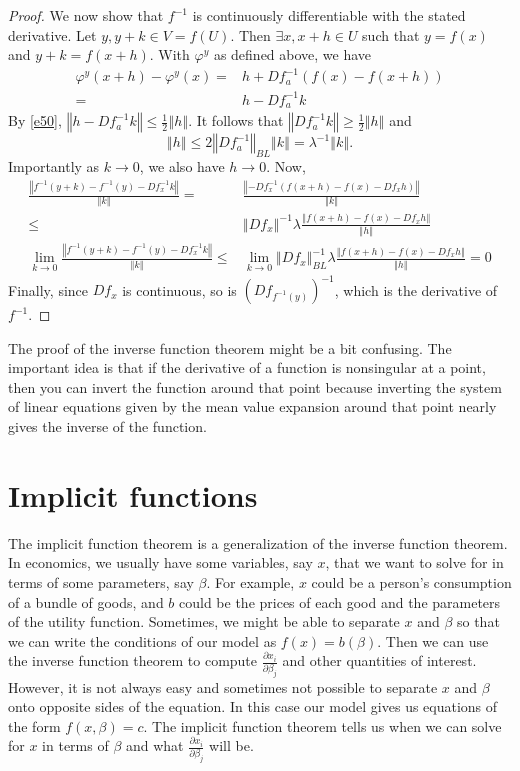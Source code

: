 \documentclass[12pt,reqno]{amsart}
\theoremstyle{definition}
\newcommand{\norm}[1]{\left\Vert {#1} \right\Vert}
\renewcommand{\to}{{\rightarrow}}
\begin{document}
\begin{proof}
  We now show that $f^{-1}$ is continuously differentiable with the
  stated derivative. Let $y, y+k \in V = f(U)$. Then $\exists x, x+h
  \in U$ such that $y = f(x)$ and $y+k = f(x+h)$. With $\varphi^y$ as
  defined above, we have
  \begin{align*}
    \varphi^y(x+h) - \varphi^y(x) = & h + Df_a^{-1}(f(x) - f(x+h))  \\
    = & h - Df_a^{-1} k
  \end{align*}
  By \ref{e50}, $\norm{h - Df_a^{-1} k} \leq \frac{1}{2} \norm{h}$. It
  follows that $\norm{Df_a^{-1} k} \geq \frac{1}{2} \norm{h}$ and 
  \[ \norm{h} \leq 2 \norm{Df_a^{-1}}_{BL} \norm{k} = \lambda^{-1}
  \norm{k}. \]
  Importantly as $k \to 0$, we also have $h \to 0$. Now, 
  \begin{align*}
    \frac{\norm{f^{-1} (y+k) - f^{-1}(y) - Df_x^{-1} k }}{\norm{k}}
    = & \frac{\norm{-Df_x^{-1}(f(x+h) - f(x) - Df_x h)}}{\norm{k}}
    \\
    \leq & \norm{Df_x}^{-1}\lambda \frac{\norm{f(x+h) - f(x) - Df_x
        h}}{\norm{h}} \\
    \lim_{k \to 0} \frac{\norm{f^{-1} (y+k) - f^{-1}(y) - Df_x^{-1} k
      }}{\norm{k}} \leq & \lim_{k \to 0} \norm{Df_x}_{BL}^{-1}\lambda
    \frac{\norm{f(x+h) - f(x) - Df_x h}}{\norm{h}} = 0
  \end{align*}
  Finally, since $Df_x$ is continuous, so is $(Df_{f^{-1}(y)})^{-1}$,
  which is the derivative of $f^{-1}$.  
\end{proof}
The proof of the inverse function theorem might be a bit
confusing. The important idea is that if the derivative of a function
is nonsingular at a point, then you can invert the function around
that point because inverting the system of linear equations given by
the mean value expansion around that point nearly gives the inverse of
the function. 

\section{Implicit functions}

The implicit function theorem is a generalization of the inverse
function theorem. In economics, we usually have some variables, say
$x$, that we want to solve for in terms of some parameters, say
$\beta$. For example, $x$ could be a person's consumption of a bundle of
goods, and $b$ could be the prices of each good and the parameters of
the utility function. Sometimes, we might be able to separate $x$ and
$\beta$ so that we can write the conditions of our model as $f(x) =
b(\beta)$. Then we can use the inverse function theorem to compute
$\frac{\partial x_i}{  \partial \beta_j}$ and other quantities of
interest. However, it is not always easy and sometimes not possible to
separate $x$ and $\beta$ onto opposite sides of the equation. In this
case our model gives us equations of the form $f(x,\beta) = c$. The
implicit function theorem tells us when we can solve for $x$ in terms
of $\beta$ and what $\frac{\partial x_i}{\partial \beta_j}$ will be.
\end{document}
